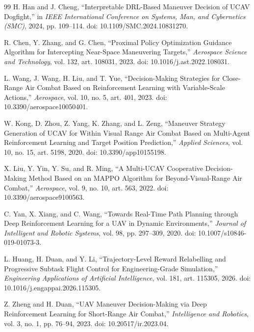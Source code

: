 \documentclass[5p,times]{elsarticle} %
\begin{document}
\begin{thebibliography}{99}
H. Han and J. Cheng,
``Interpretable DRL-Based Maneuver Decision of UCAV Dogfight,''
in \emph{IEEE International Conference on Systems, Man, and Cybernetics (SMC)}, 2024, pp. 109--114.
doi: 10.1109/SMC.2024.10831270.

R. Chen, Y. Zhang, and G. Chen,
``Proximal Policy Optimization Guidance Algorithm for Intercepting Near-Space Maneuvering Targets,''
\emph{Aerospace Science and Technology}, vol. 132, art. 108031, 2023.
doi: 10.1016/j.ast.2022.108031.

L. Wang, J. Wang, H. Liu, and T. Yue,
``Decision-Making Strategies for Close-Range Air Combat Based on Reinforcement Learning with Variable-Scale Actions,''
\emph{Aerospace}, vol. 10, no. 5, art. 401, 2023.
doi: 10.3390/aerospace10050401.

W. Kong, D. Zhou, Z. Yang, K. Zhang, and L. Zeng,
``Maneuver Strategy Generation of UCAV for Within Visual Range Air Combat Based on Multi-Agent Reinforcement Learning and Target Position Prediction,''
\emph{Applied Sciences}, vol. 10, no. 15, art. 5198, 2020.
doi: 10.3390/app10155198.

X. Liu, Y. Yin, Y. Su, and R. Ming,
``A Multi-UCAV Cooperative Decision-Making Method Based on an MAPPO Algorithm for Beyond-Visual-Range Air Combat,''
\emph{Aerospace}, vol. 9, no. 10, art. 563, 2022.
doi: 10.3390/aerospace9100563.

C. Yan, X. Xiang, and C. Wang,
``Towards Real-Time Path Planning through Deep Reinforcement Learning for a UAV in Dynamic Environments,''
\emph{Journal of Intelligent and Robotic Systems}, vol. 98, pp. 297--309, 2020.
doi: 10.1007/s10846-019-01073-3.

L. Huang, H. Duan, and Y. Li,
``Trajectory-Level Reward Relabelling and Progressive Subtask Flight Control for Engineering-Grade Simulation,''
\emph{Engineering Applications of Artificial Intelligence}, vol. 181, art. 115305, 2026.
doi: 10.1016/j.engappai.2026.115305.

Z. Zheng and H. Duan,
``UAV Maneuver Decision-Making via Deep Reinforcement Learning for Short-Range Air Combat,''
\emph{Intelligence and Robotics}, vol. 3, no. 1, pp. 76--94, 2023.
doi: 10.20517/ir.2023.04.

\end{thebibliography}
\end{document}
